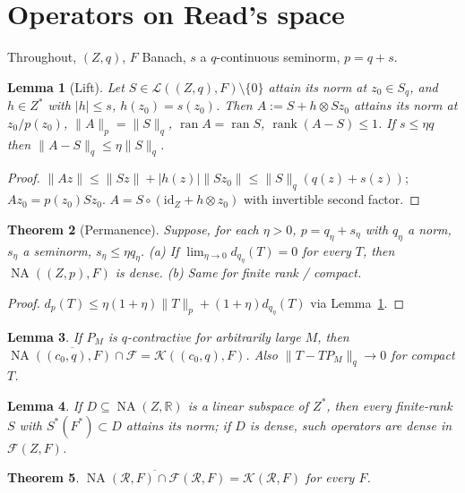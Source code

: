 \documentclass[10pt]{amsart}
\newtheorem{theorem}{Theorem}[section]
\newtheorem{lemma}[theorem]{Lemma}
\theoremstyle{remark}
\newcommand{\K}{\mathcal K}
\newcommand{\Fin}{\mathcal{F}}
\newcommand{\rank}{\operatorname{rank}}
\newcommand{\ran}{\operatorname{ran}}
\newcommand{\id}[1]{\mathrm{id}_{#1}}
\newcommand{\R}{\mathbb{R}}
\newcommand{\Read}{\mathcal{R}}
\newcommand{\NA}{\operatorname{NA}}
\newcommand{\Lin}{\mathcal{L}}
\begin{document}
\section{Operators on Read's space}\label{sec:additive}
Throughout, $(Z,q)$, $F$ Banach, $s$ a $q$-continuous seminorm, $p=q+s$.
\begin{lemma}[Lift]\label{lem:lift}
Let $S\in\Lin((Z,q),F)\setminus\{0\}$ attain its norm at $z_0\in S_q$, and $h\in Z^*$ with $|h|\le s$, $h(z_0)=s(z_0)$. Then $A:=S+h\otimes Sz_0$ attains its norm at $z_0/p(z_0)$, $\|A\|_p=\|S\|_q$, $\ran A=\ran S$, $\rank(A-S)\le1$. If $s\le\eta q$ then $\|A-S\|_q\le\eta\|S\|_q$.
\end{lemma}
\begin{proof}
$\|Az\|\le\|Sz\|+|h(z)|\|Sz_0\|\le\|S\|_q(q(z)+s(z))$; $Az_0=p(z_0)Sz_0$. $A=S\circ(\id{Z}+h\otimes z_0)$ with invertible second factor.
\end{proof}
\begin{theorem}[Permanence]\label{thm:permanence}
Suppose, for each $\eta>0$, $p=q_\eta+s_\eta$ with $q_\eta$ a norm, $s_\eta$ a seminorm, $s_\eta\le\eta q_\eta$. (a) If $\lim_{\eta\to0}d_{q_\eta}(T)=0$ for every $T$, then $\NA((Z,p),F)$ is dense. (b) Same for finite rank / compact.
\end{theorem}
\begin{proof} $d_p(T)\le\eta(1+\eta)\|T\|_p+(1+\eta)d_{q_\eta}(T)$ via Lemma~\ref{lem:lift}.\end{proof}
\begin{lemma}\label{lem:projections}
If $P_M$ is $q$-contractive for arbitrarily large $M$, then $\overline{\NA((c_0,q),F)\cap\Fin}=\K((c_0,q),F)$. Also $\|T-TP_M\|_q\to0$ for compact $T$.
\end{lemma}
\begin{lemma}\label{lem:densesubspace}
If $D\subseteq\NA(Z,\R)$ is a linear subspace of $Z^*$, then every finite-rank $S$ with $S^*(F^*)\subset D$ attains its norm; if $D$ is dense, such operators are dense in $\Fin(Z,F)$.
\end{lemma}
\begin{theorem}\label{thm:read-finite-density}
$\overline{\NA(\Read,F)\cap\Fin(\Read,F)}=\K(\Read,F)$ for every $F$.
\end{theorem}
\end{document}
